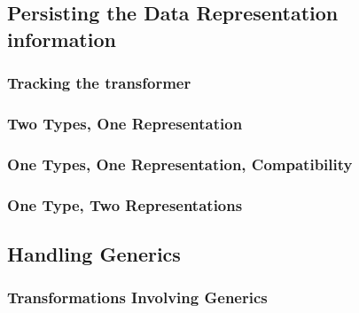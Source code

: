 
\subsection{Persisting the Data Representation information}



\subsubsection{Tracking the transformer}

\subsubsection{Two Types, One Representation}

\subsubsection{One Types, One Representation, Compatibility}

\subsubsection{One Type, Two Representations}

\subsection{Handling Generics}

\subsubsection{Transformations Involving Generics}



